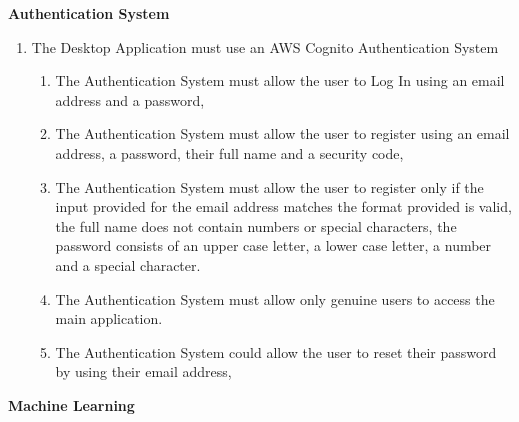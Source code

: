\newpage

\noindent
\textbf{Authentication System}

\begin{enumerate}
    \item The Desktop Application must use an AWS Cognito Authentication System
    \begin{enumerate}
        \item The Authentication System must allow the user to Log In using an email address and a password,
        \item The Authentication System must allow the user to register using an email address, a password,
              their full name and a security code,
        \item The Authentication System must allow the user to register only if the input provided for the email
              address matches the format provided is valid, the full name does not contain numbers or special
              characters, the password consists of an upper case letter, a lower case letter, a number and a
              special character.
        \item The Authentication System must allow only genuine users to access the main application.
        \item The Authentication System could allow the user to reset their password by using their email address,
    \end{enumerate}
\end{enumerate}

\noindent
\textbf{Machine Learning}


